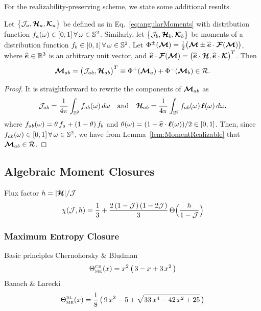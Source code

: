 For the realizability-preserving scheme, we state some additional results.  
\begin{lemma}
  Let $\big\{\mathcal{J}_{a},\boldsymbol{\mathcal{H}}_{a},\boldsymbol{\mathcal{K}}_{a}\big\}$ be defined as in Eq.~\eqref{eq:angularMoments} with distribution function $f_{a}(\omega)\in[0,1]\,\forall\,\omega\in\mathbb{S}^{2}$.  
  Similarly, let $\big\{\mathcal{J}_{b},\boldsymbol{\mathcal{H}}_{b},\boldsymbol{\mathcal{K}}_{b}\big\}$ be moments of a distribution function $f_{b}\in[0,1]\,\forall\,\omega\in\mathbb{S}^{2}$.  
  Let $\Phi^{\pm}(\boldsymbol{\mathcal{M}})=\frac{1}{2}\big(\boldsymbol{\mathcal{M}}\pm\widehat{\boldsymbol{e}}\cdot\boldsymbol{\mathcal{F}}(\boldsymbol{\mathcal{M}})\big)$, where $\widehat{\boldsymbol{e}}\in\mathbb{R}^{3}$ is an arbitrary unit vector, and $\widehat{\boldsymbol{e}}\cdot\boldsymbol{\mathcal{F}}(\boldsymbol{\mathcal{M}})=\big(\widehat{\boldsymbol{e}}\cdot\boldsymbol{\mathcal{H}},\widehat{\boldsymbol{e}}\cdot\boldsymbol{\mathcal{K}}\big)^{T}$.  
  Then
  \begin{equation*}
    \boldsymbol{\mathcal{M}}_{ab} = \big(\mathcal{J}_{ab},\boldsymbol{\mathcal{H}}_{ab}\big)^{T} \equiv \Phi^{+}(\boldsymbol{\mathcal{M}}_{a})+\Phi^{-}(\boldsymbol{\mathcal{M}}_{b})\in\mathcal{R}.
  \end{equation*}
\end{lemma}
\begin{proof}
  It is straightforward to rewrite the components of $\boldsymbol{\mathcal{M}}_{ab}$ as
  \begin{equation*}
    \mathcal{J}_{ab}=\frac{1}{4\pi}\int_{\mathbb{S}^{2}}f_{ab}(\omega)\,d\omega
    \quad\text{and}\quad
    \boldsymbol{\mathcal{H}}_{ab}=\frac{1}{4\pi}\int_{\mathbb{S}^{2}}f_{ab}(\omega)\,\boldsymbol{\ell}(\omega)\,d\omega,
  \end{equation*}
  where $f_{ab}(\omega)=\theta\,f_{a}+(1-\theta)\,f_{b}$ and $\theta(\omega)=(1+\widehat{\boldsymbol{e}}\cdot\boldsymbol{\ell}(\omega))/2\in[0,1]$.  
  Then, since $f_{ab}(\omega)\in[0,1]\,\forall\,\omega\in\mathbb{S}^{2}$, we have from Lemma~\ref{lem:MomentRealizable} that $\boldsymbol{\mathcal{M}}_{ab}\in\mathcal{R}$.  
\end{proof}

\subsection{Algebraic Moment Closures}

Flux factor $h=|\boldsymbol{\mathcal{H}}|/\mathcal{J}$
\begin{equation}
  \chi(\mathcal{J},h)=\frac{1}{3}+\frac{2\,(1-\mathcal{J})\,(1-2\mathcal{J})}{3}\,\Theta\Big(\frac{h}{1-\mathcal{J}}\Big)
\end{equation}

\subsubsection{Maximum Entropy Closure}
Basic principles
Chernohorsky \& Bludman \cite{cernohorskyBludman_1994}
\begin{equation}
  \Theta_{\mbox{\tiny ME}}^{\mbox{\tiny CB}}(x)
  =x^{2}\,\big(\,3-x+3\,x^{2}\,\big)
\end{equation}
Banach \& Larecki
\begin{equation}
  \Theta_{\mbox{\tiny ME}}^{\mbox{\tiny BL}}(x)
  =\frac{1}{8}\,\big(\,9\,x^{2}-5+\sqrt{33\,x^{4}-42\,x^{2}+25}\,\big)
\end{equation}


